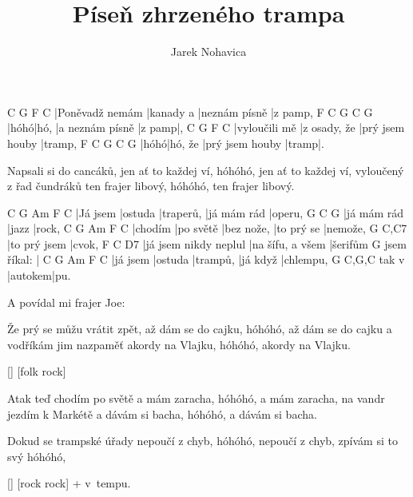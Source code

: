 \documentclass{song}
\author{Jarek Nohavica}
\title{Píseň zhrzeného trampa}
\begin{document}
\strophe
C               G         F             C
|Poněvadž nemám |kanady a |neznám písně |z pamp,
F    C    G               C      G
|hóhó|hó, |a neznám písně |z pamp|,
C             G            F               C
|vyloučili mě |z osady, že |prý jsem houby |tramp,
F    C       G               C     G
|hóhó|hó, že |prý jsem houby |tramp|.
\endstrophe

\strophe*
Napsali si do cancáků, jen ať to každej ví,
hóhóhó, jen ať to každej ví,
vyloučený z řad čundráků ten frajer libový,
hóhóhó, ten frajer libový.
\endstrophe

C        G       Am        F           C
|Já jsem |ostuda |traperů, |já mám rád |operu,
G           C     G
|já mám rád |jazz |rock,
C       G         Am         F          C
|chodím |po světě |bez nože, |to prý se |nemože,
G            C,C7
|to prý jsem |cvok,
F                     C                D7
|já jsem nikdy neplul |na šífu, a všem |šerifům
            G
jsem říkal: |
C        G       Am       F        C
|já jsem |ostuda |trampů, |já když |chlempu,
      G       C,G,C
tak v |autokem|pu.
\endstrophe

\bigskip

\begin{multicols}{2}

\strophe*
A povídal mi frajer Joe: 
\endstrophe

\strophe*
Že prý se můžu vrátit zpět, až dám se do cajku,
hóhóhó, až dám se do cajku
a vodříkám jim nazpaměť akordy na Vlajku,
hóhóhó, akordy na Vlajku.
\endstrophe

\ref{} [folk rock]

\columnbreak

\strophe*
Atak teď chodím po světě a mám zaracha,
hóhóhó, a mám zaracha,
na vandr jezdím k Markétě a dávám si bacha,
hóhóhó, a dávám si bacha.
\endstrophe

\strophe*
Dokud se trampské úřady nepoučí z chyb,
hóhóhó, nepoučí z chyb,
zpívám si to svý 
hóhóhó, 
\endstrophe

\ref{} [rock rock] + v~tempu.

\end{multicols}
\end{document}

